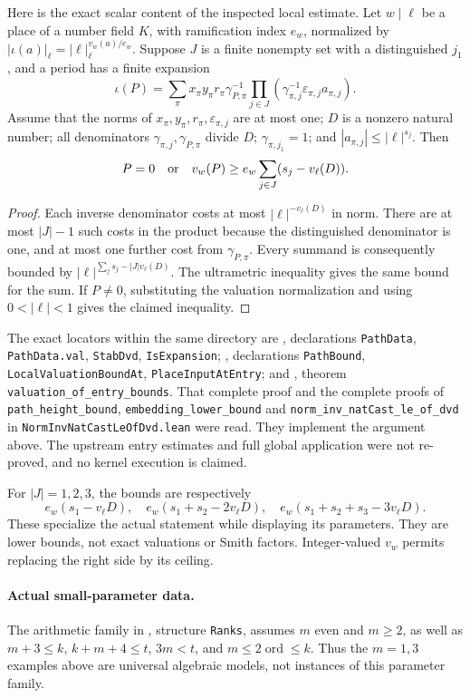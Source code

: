 Here is the exact scalar content of the inspected local estimate.  Let
$w\mid\ell$ be a place of a number field $K$, with ramification index
$e_w$, normalized by
$|\iota(a)|_\ell=|\ell|_\ell^{v_w(a)/e_w}$.  Suppose $J$ is a finite
nonempty set with a distinguished $j_1$, and a period has a finite expansion
\[
 \iota(P)=\sum_\pi x_\pi y_\pi r_\pi\gamma_{P,\pi}^{-1}
        \prod_{j\in J}
          (\gamma_{\pi,j}^{-1}\varepsilon_{\pi,j}a_{\pi,j}).
\]
Assume that the norms of $x_\pi,y_\pi,r_\pi,\varepsilon_{\pi,j}$ are
at most one; $D$ is a nonzero natural number; all denominators
$\gamma_{\pi,j},\gamma_{P,\pi}$ divide $D$;
$\gamma_{\pi,j_1}=1$; and $|a_{\pi,j}|\le|\ell|^{s_j}$.  Then
\[
 P=0\quad\hbox{or}\quad
 v_w(P)\ge e_w\sum_{j\in J}(s_j-v_\ell(D)).
\]
\begin{proof}
Each inverse denominator costs at most $|\ell|^{-v_\ell(D)}$ in norm.
There are at most $|J|-1$ such costs in the product because the distinguished
denominator is one, and at most one further cost from $\gamma_{P,\pi}$.
Every summand is consequently bounded by
$|\ell|^{\sum_js_j-|J|v_\ell(D)}$.  The ultrametric inequality gives
the same bound for the sum.  If $P\ne0$, substituting the valuation
normalization and using $0<|\ell|<1$ gives the claimed inequality.
\end{proof}

The exact locators within the same directory are
, declarations
\texttt{PathData}, \texttt{PathData.val}, \texttt{StabDvd},
\texttt{IsExpansion}; , declarations
\texttt{PathBound}, \texttt{LocalValuationBoundAt},
\texttt{PlaceInputAtEntry}; and
, theorem
\texttt{valuation\_of\_entry\_bounds}.  That complete proof and the
complete proofs of \texttt{path\_height\_bound},
\texttt{embedding\_lower\_bound} and
\texttt{norm\_inv\_natCast\_le\_of\_dvd} in
\texttt{NormInvNatCastLeOfDvd.lean} were read.  They implement the
argument above.  The upstream entry estimates and full global application
were not re-proved, and no kernel execution is claimed.

For $|J|=1,2,3$, the bounds are respectively
\[
 e_w(s_1-v_\ell D),\quad
 e_w(s_1+s_2-2v_\ell D),\quad
 e_w(s_1+s_2+s_3-3v_\ell D).
\]
These specialize the actual statement while displaying its parameters.
They are lower bounds, not exact valuations or Smith factors.  Integer-valued
$v_w$ permits replacing the right side by its ceiling.

\paragraph{Actual small-parameter data.}
The arithmetic family in
, structure
\texttt{Ranks}, assumes $m$ even and $m\ge2$, as well as
$m+3\le k$, $k+m+4\le t$, $3m<t$, and
$m\le2\operatorname{ord}\le k$.  Thus the $m=1,3$ examples above are
universal algebraic models, not instances of this parameter family.

